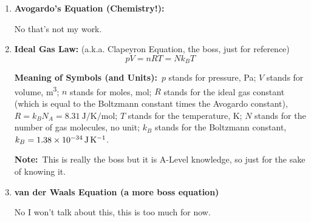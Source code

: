\documentclass[8pt]{article}
\newcommand{\MeanSymb}{\textbf{Meaning of Symbols (and Units):}\ }
\newcommand{\Note}{\textbf{Note:}\ }
\begin{document}
\begin{enumerate}
                \Note This only remains true if volume is a constant.

                \item \textbf{Avogardo's Equation (Chemistry!):}
                
                No that's not my work.

                \item \textbf{Ideal Gas Law:} (a.k.a. Clapeyron Equation, the boss, just for reference)
                \[
                    pV = nRT = Nk_{B}T
                \]

                \MeanSymb \(p\) stands for pressure, \unit{\pascal}; \(V\) stands for volume, \unit{\metre\cubed}; \(n\) stands for moles, \unit{\mole}; \(R\) stands for the ideal gas constant (which is equal to the Boltzmann constant times the Avogardo constant), \(R = k_B N_A = \qty{8.31}{\joule \per \kelvin \per \mole}\); \(T\) stands for the temperature, \unit{\kelvin}; \(N\) stands for the number of gas molecules, no unit; \(k_B\) stands for the Boltzmann constant, \(k_B = \qty{1.38 e -34}{\joule \per \kelvin}\).

                \Note This is really the boss but it is A-Level knowledge, so just for the sake of knowing it.
                
                \item \textbf{van der Waals Equation (a more boss equation)}
                
                No I won't talk about this, this is too much for now.
            \end{enumerate}
\end{document}
